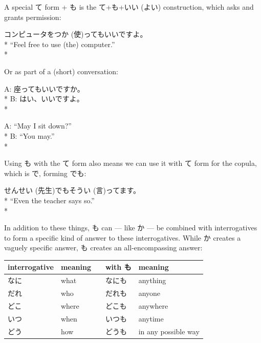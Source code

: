 \documentclass[11pt, b5paper, twoside, openright, onecolumn]{book}
\makeatletter
\newcommand*{\rubystack}[2]{{\relscale{0.5}%
  \begin{tabular}[b]{@{}c@{}}%
    {#1}\\%
   {\textscale{2}{#2}}%
  \end{tabular}}%
}
\DeclareRobustCommand*{\ruby}[2]{%
  \mbox{%
    \setlength{\parskip}{0ex}%
    \BeginAccSupp{method=pdfstringdef,ActualText={#1}}%
      \rubystack{\phantom{#2}}{#1}%
      \llap{%
        \rubystack{#2}{\phantom{#1}}%
      }%
    \EndAccSupp{}%
  }%
}
\renewcommand*{\ruby}[2]{#2 (#1)}%
\newenvironment{exampleblock}{
\setlength{\parindent}{0.6in}
\begin{minipage}[t]{\dimexpr\textwidth-\parindent}}
{\end{minipage}}
\newenvironment{mytabular}[1]{\noindent\hspace{0.4in}
\begin{tabular}[h]{#1}}{\end{tabular}}
\makeatother
\begin{document}
A special て form + も is the て+も+いい (よい) construction‚ which asks and grants permission:

\vspace{0.4cm}
\begin{exampleblock}
コンピュータを\ruby{使}{つか}ってもいいですよ。 \\* 
“Feel free to use (the) computer.” \\* 
\end{exampleblock}
\vspace{0.2cm}

Or as part of a (short) conversation:

\vspace{0.4cm}
\begin{exampleblock}
A: 座ってもいいですか。 \\* 
B: はい、いいですよ。 \\* 
\end{exampleblock}
\vspace{0.2cm}

\begin{exampleblock}
A: “May I sit down?” \\* 
B: “You may.” \\* 
\end{exampleblock}
\vspace{0.2cm}

Using も with the て form also means we can use it with て form for the copula‚ which is で‚ forming でも:

\vspace{0.4cm}
\begin{exampleblock}
\ruby{先生}{せんせい}でもそう\ruby{言}{い}ってます。 \\* 
“Even the teacher says so.” \\* 
\end{exampleblock}
\vspace{0.2cm}

In addition to these things‚ も can — like か — be combined with interrogatives to form a specific kind of answer to these interrogatives. While か creates a vaguely specific answer‚ も creates an all-encompassing answer:

\vspace{0.5cm}
\smaller
\begin{mytabular}{| l  l  l  l  l |}\hline 
\rule{0pt}{2.4ex}interrogative & meaning &  & with も & meaning\\ 
\hline
\rule{0pt}{2.4ex}なに & what &  & なにも & anything\\ 
\rule{0pt}{2.4ex}だれ & who &  & だれも & anyone\\ 
\rule{0pt}{2.4ex}どこ & where &  & どこも & anywhere\\ 
\rule{0pt}{2.4ex}いつ & when &  & いつも & anytime\\ 
\rule{0pt}{2.4ex}どう & how &  & どうも & in any possible way\\ 
\hline 
\end{mytabular}
\larger
\vspace{0.5cm}
\end{document}
